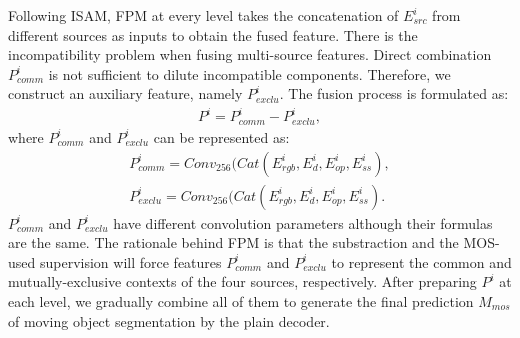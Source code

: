 \documentclass[sigconf]{acmart}
\begin{document}
Following ISAM, FPM at every level takes the concatenation of ${E}_{src}^i$ from different sources as inputs to obtain the fused feature. There is the incompatibility problem when fusing multi-source features. Direct combination ${P}_{comm}^i$ is not sufficient to dilute incompatible components. Therefore, we construct an auxiliary feature, namely ${P}_{exclu}^i$.
The fusion process is formulated as:
\begin{equation}\label{equ:4}
    \begin{split}
        {P}^{i} = {P}_{comm}^i - {P}_{exclu}^i, 
    \end{split}
\end{equation}
where ${P}_{comm}^i$ and ${P}_{exclu}^i$ can be represented as:  
\begin{equation}\label{equ:44}
    \begin{split}
       {P}_{comm}^i = Conv_{256}(Cat({E}_{rgb}^i, {E}_{d}^i, {E}_{op}^i, {E}_{ss}^i), \\
       {P}_{exclu}^i = Conv_{256}(Cat({E}_{rgb}^i, {E}_{d}^i, {E}_{op}^i, {E}_{ss}^i).
    \end{split}
\end{equation}
${P}_{comm}^i$ and ${P}_{exclu}^i$ have different convolution parameters although their formulas are the same. The rationale behind FPM is that the substraction and the MOS-used supervision will force features ${P}_{comm}^i$ and ${P}_{exclu}^i$ to represent the common and mutually-exclusive contexts of the four sources, respectively.  After preparing ${P}^{i}$ at each level, we gradually combine all of them to generate the final prediction $M_{mos}$ of moving object segmentation by the plain decoder.
\end{document}
